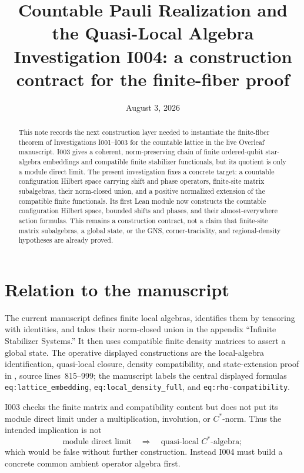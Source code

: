 \documentclass[11pt,reqno]{amsart}
\title[Countable Pauli realization]{Countable Pauli Realization and the Quasi-Local Algebra\\
\large Investigation I004: a construction contract for the finite-fiber proof}
\author{}
\date{August 3, 2026}
\numberwithin{equation}{section}
\theoremstyle{definition}
\theoremstyle{remark}
\begin{document}
\begin{abstract}
This note records the next construction layer needed to instantiate the
finite-fiber theorem of Investigations I001--I003 for the countable lattice in
the live Overleaf manuscript.  I003 gives a coherent, norm-preserving chain of
finite ordered-qubit star-algebra embeddings and compatible finite stabilizer
functionals, but its quotient is only a module direct limit.  The present
investigation fixes a concrete target: a countable configuration Hilbert space
carrying shift and phase operators, finite-site matrix subalgebras, their
norm-closed union, and a positive normalized extension of the compatible
finite functionals.  Its first Lean module now constructs the countable
configuration Hilbert space, bounded shifts and phases, and their
almost-everywhere action formulas.  This remains a construction contract, not
a claim that finite-site matrix subalgebras, a global state, or the GNS,
corner-traciality, and regional-density hypotheses are already proved.
\end{abstract}

\maketitle

\section{Relation to the manuscript}
\label{sec:relation_to_manuscript}

The current manuscript defines finite local algebras, identifies them by
tensoring with identities, and takes their norm-closed union in the appendix
``Infinite Stabilizer Systems.''  It then uses compatible finite density
matrices to assert a global state.  The operative displayed constructions are
the local-algebra identification, quasi-local closure, density compatibility,
and state-extension proof in
, source
lines~815--999; the manuscript labels the central displayed formulas
\texttt{eq:lattice\_embedding}, \texttt{eq:local\_density\_full}, and
\texttt{eq:rho-compatibility}.

I003 checks the finite matrix and compatibility content but does not put its
module direct limit under a multiplication, involution, or $C^*$-norm.  Thus
the intended implication is not
\begin{equation}
  \text{module direct limit}
  \quad\Longrightarrow\quad
  \text{quasi-local }C^*\text{-algebra};
  \label{eq:no_automatic_colimit}
\end{equation}
which would be false without further construction.  Instead I004 must build
a concrete common ambient operator algebra first.
\end{document}
